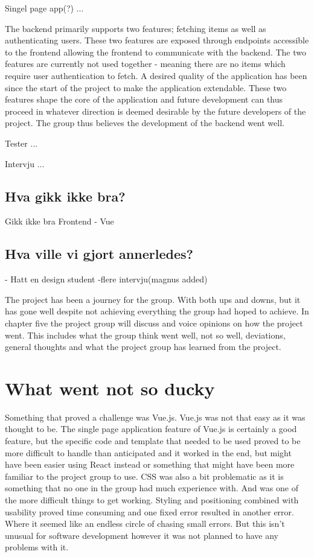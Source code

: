 Singel page app(?) ...

The backend primarily supports two features; fetching items as well as authenticating users.
These two features are exposed through endpoints accessible to the frontend allowing the frontend to communicate with the backend.
The two features are currently not used together - meaning there are no items which require user authentication to fetch.
A desired quality of the application has been since the start of the project to make the application extendable.
These two features shape the core of the application and future development can thus proceed in whatever direction is deemed desirable by the future developers of the project.
The group thus believes the development of the backend went well.

Tester ...

Intervju ...

\subsection{Hva gikk ikke bra?}
Gikk ikke bra
Frontend - Vue

\subsection{Hva ville vi gjort annerledes? }
- Hatt en design student
-flere intervju(magnus added)

The project has been a journey for the group. With both ups and downs, but it has gone well despite not achieving everything the group had hoped to achieve. In chapter five the project group will discuss and voice opinions on how the project went. This includes what the group think went well, not so well, deviations, general thoughts and what the project group has learned from the project.   

\section{What went not so ducky}
Something that proved a challenge was Vue.js. Vue.js was not that easy as it was thought to be. The single page application feature of Vue.js is certainly a good feature, but the specific code and template that needed to be used proved to be more difficult to handle than anticipated and it worked in the end, but might have been easier using React instead or something that might have been more familiar to the project group to use. CSS was  also a bit problematic as it is something that no one in the group had much experience with. And was one of the more difficult things to get working. Styling and positioning combined with usability proved time consuming and one fixed error resulted in another error. Where it seemed like an endless circle of chasing small errors. But this isn't unusual for software development however it was not planned to have any problems with it. 

